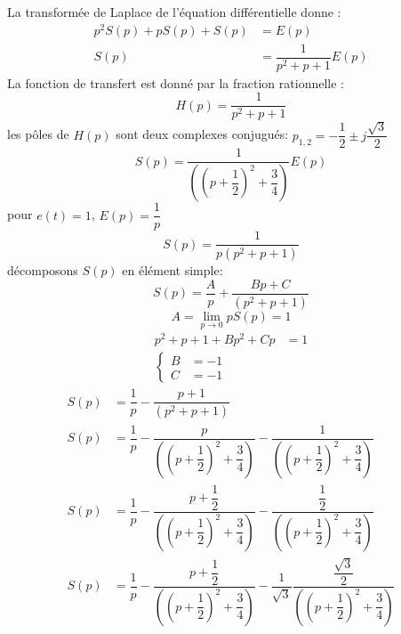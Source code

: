 \newpage
La transformée de Laplace de l'équation différentielle donne :
\begin{align*}
    p^2S(p)+pS(p)+S(p)&=E(p) \\
    S(p)&=\dfrac{1}{p^2+p+1}E(p)
\end{align*}
La fonction de transfert est donné par la fraction rationnelle :
\[
H(p)=\dfrac{1}{p^2+p+1}
\]
les pôles de $H(p)$ sont deux complexes conjugués:
$p_{1,2}=-\dfrac{1}{2}\pm j\dfrac{\sqrt{3}}{2}$
\[
S(p) = \dfrac{1}{\left(\left(p+\dfrac{1}{2}\right)^2+
       \dfrac{3}{4}\right)}E(p)
\]
pour $e(t)=1$, $E(p)=\dfrac{1}{p}$
\[
S(p) =\dfrac{1}{p\left(p^2+p+1\right)}
\]
décomposons $S(p)$ en élément simple:
\[
S(p)=\dfrac{A}{p}+\dfrac{Bp+C}{\left(p^2+p+1\right)}
\]
\[
A=\lim\limits_{p \rightarrow 0} pS(p) = 1
\]
\begin{align*}
    p^2+p+1 + Bp^2+Cp &= 1 \\
    \begin{cases}
        B&=-1\\
        C&=-1
    \end{cases}
\end{align*}
\begin{align*}
    S(p)&=\dfrac{1}{p}-\dfrac{p+1}{\left(p^2+p+1\right)} \\
    S(p)&=\dfrac{1}{p}-\dfrac{p}{\left(\left(p+\dfrac{1}{2}\right)^2+
          \dfrac{3}{4}\right)}-
          \dfrac{1}{\left(\left(p+\dfrac{1}{2}\right)^2+\dfrac{3}{4}\right)}\\
    S(p)&=\dfrac{1}{p}-\dfrac{p+\dfrac{1}{2}}
                       {\left(\left(p+\dfrac{1}{2}\right)^2+
                                      \dfrac{3}{4}\right)}-
                       \dfrac{\dfrac{1}{2}}{\left(\left(p+\dfrac{1}{2}\right)^2+
                              \dfrac{3}{4}\right)}\\
    S(p)&=\dfrac{1}{p}-\dfrac{p+\dfrac{1}{2}}
                             {\left(\left(p+\dfrac{1}{2}\right)^2+
                                            \dfrac{3}{4}\right)}-
                       \dfrac{1}{\sqrt{3}}\dfrac{\dfrac{\sqrt{3}}{2}}
                       {\left(\left(p+\dfrac{1}{2}\right)^2+
                                      \dfrac{3}{4}\right)}
\end{align*}
